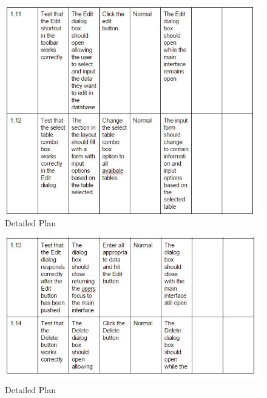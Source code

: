 \begin{itemize}
\begin{figure}[H]
    \includegraphics[width=\textwidth]{DP7.JPG}
    \caption{Detailed Plan} \label{fig:VDetailed Plan}
\end{figure}

\begin{figure}[H]
    \includegraphics[width=\textwidth]{DP8.JPG}
    \caption{Detailed Plan} \label{fig:VDetailed Plan}
\end{figure}


\end{itemize}
